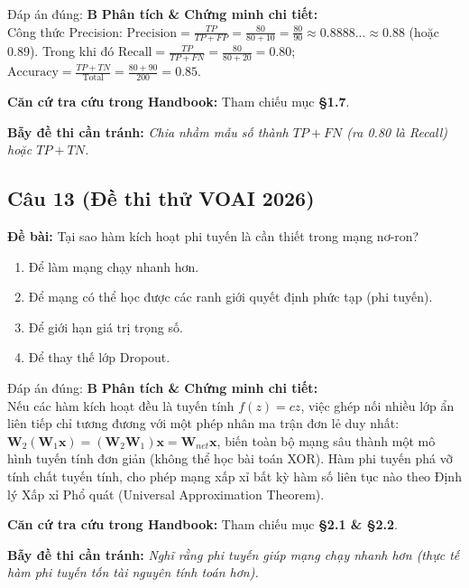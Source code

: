 \documentclass[10pt,a4paper]{article}
\begin{document}
\begin{solbox}{Đáp án đúng: \textbf{B}}
\textbf{Phân tích \& Chứng minh chi tiết:} \\
Công thức Precision: $\text{Precision} = \frac{TP}{TP + FP} = \frac{80}{80 + 10} = \frac{80}{90} \approx 0.8888... \approx 0.88$ (hoặc 0.89). Trong khi đó $\text{Recall} = \frac{TP}{TP + FN} = \frac{80}{80 + 20} = 0.80$; $\text{Accuracy} = \frac{TP + TN}{\text{Total}} = \frac{80 + 90}{200} = 0.85$.

\vspace{0.4em}
\textbf{Căn cứ tra cứu trong Handbook:} Tham chiếu mục \textbf{§1.7}.

\vspace{0.4em}
\textbf{Bẫy đề thi cần tránh:} \textit{Chia nhầm mẫu số thành $TP + FN$ (ra 0.80 là Recall) hoặc $TP + TN$.}
\end{solbox}
\vspace{0.5em}


\subsection*{Câu 13 (Đề thi thử VOAI 2026)}
\textbf{Đề bài:} Tại sao hàm kích hoạt phi tuyến là cần thiết trong mạng nơ-ron?

\begin{enumerate}[label=\textbf{\Alph*.}]
    \item Để làm mạng chạy nhanh hơn.
    \item Để mạng có thể học được các ranh giới quyết định phức tạp (phi tuyến).
    \item Để giới hạn giá trị trọng số.
    \item Để thay thế lớp Dropout.
\end{enumerate}

\begin{solbox}{Đáp án đúng: \textbf{B}}
\textbf{Phân tích \& Chứng minh chi tiết:} \\
Nếu các hàm kích hoạt đều là tuyến tính $f(z) = c z$, việc ghép nối nhiều lớp ẩn liên tiếp chỉ tương đương với một phép nhân ma trận đơn lẻ duy nhất: $\mathbf{W}_2(\mathbf{W}_1 \mathbf{x}) = (\mathbf{W}_2 \mathbf{W}_1)\mathbf{x} = \mathbf{W}_{net} \mathbf{x}$, biến toàn bộ mạng sâu thành một mô hình tuyến tính đơn giản (không thể học bài toán XOR). Hàm phi tuyến phá vỡ tính chất tuyến tính, cho phép mạng xấp xỉ bất kỳ hàm số liên tục nào theo Định lý Xấp xỉ Phổ quát (Universal Approximation Theorem).

\vspace{0.4em}
\textbf{Căn cứ tra cứu trong Handbook:} Tham chiếu mục \textbf{§2.1 \& §2.2}.

\vspace{0.4em}
\textbf{Bẫy đề thi cần tránh:} \textit{Nghĩ rằng phi tuyến giúp mạng chạy nhanh hơn (thực tế hàm phi tuyến tốn tài nguyên tính toán hơn).}
\end{solbox}
\vspace{0.5em}
\end{document}

